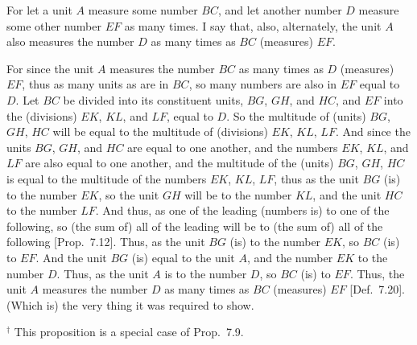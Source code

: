 \begin{Parallel}{}{}
{\epsfysize=0.65in
\centerline{}

For let a unit $A$ measure some number $BC$, and let another number $D$ measure some
other number $EF$ as many times. I  say that, also, alternately,
the unit $A$ also measures the number $D$ as many times
as $BC$ (measures) $EF$.

For since the unit $A$ measures the number $BC$ as many times as 
$D$ (measures) $EF$, thus as many units as are in $BC$, so many 
numbers are also in  $EF$ equal to $D$. Let $BC$ be divided into its
constituent units, $BG$, $GH$, and $HC$, and $EF$ into the (divisions) $EK$, $KL$, and $LF$, equal
to $D$. So the multitude of (units) $BG$, $GH$, $HC$ will be equal to the multitude
of (divisions) $EK$, $KL$, $LF$. And since the units $BG$, $GH$, and $HC$ are equal to
one another, and the numbers $EK$, $KL$,  and $LF$ are also equal to one another, and the multitude of the (units) $BG$, $GH$, $HC$ is
equal to the multitude of the numbers $EK$, $KL$, $LF$,
thus as the unit $BG$ (is) to the number $EK$, so the unit $GH$ will be to the number $KL$, and
the unit $HC$ to the number $LF$. And thus, as one of the leading (numbers is) to
one of the following, so (the sum of) all of the leading will be to (the sum of) all of the following 
[Prop.~7.12]. Thus, as the unit $BG$ (is) to the number $EK$,
so $BC$ (is) to $EF$. And the unit $BG$ (is) equal to the unit $A$, and the number
$EK$ to the number $D$. Thus, as the unit $A$ is to the number $D$, so $BC$ (is) to
$EF$. Thus, the unit $A$ measures the number $D$ as many times as $BC$ (measures)
$EF$ [Def.~7.20]. (Which is) the very thing it was required to show.}
\end{Parallel}
{\footnotesize\noindent$^\dag$ This proposition is a
special case of Prop.~7.9.}

